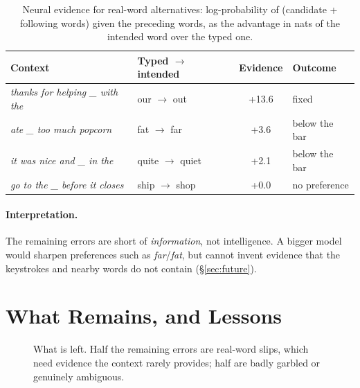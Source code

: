 \documentclass[11pt,a4paper]{article}
\begin{document}
\begin{table}[t]
\centering\small
\caption{Neural evidence for real-word alternatives: log-probability of (candidate + following words) given the preceding words, as the advantage in nats of the intended word over the typed one.}
\label{tab:nnpairs}
\begin{tabular}{llcl}
\toprule
Context & Typed $\to$ intended & Evidence & Outcome \\
\midrule
\emph{thanks for helping \_ with the} & our $\to$ out & +13.6 & fixed \\
\emph{ate \_ too much popcorn} & fat $\to$ far & +3.6 & below the bar \\
\emph{it was nice and \_ in the} & quite $\to$ quiet & +2.1 & below the bar \\
\emph{go to the \_ before it closes} & ship $\to$ shop & +0.0 & no preference \\
\bottomrule
\end{tabular}
\end{table}

\paragraph{Interpretation.} The remaining errors are short of \emph{information}, not intelligence. A bigger model would sharpen preferences such as \emph{far}/\emph{fat}, but cannot invent evidence that the keystrokes and nearby words do not contain (\S\ref{sec:future}).

\section{What Remains, and Lessons}
\label{sec:lessons}

\begin{figure}[t]
\centering
{}
\caption{What is left. Half the remaining errors are real-word slips, which need evidence the context rarely provides; half are badly garbled or genuinely ambiguous.}
\label{fig:remaining}
\end{figure}
\end{document}
